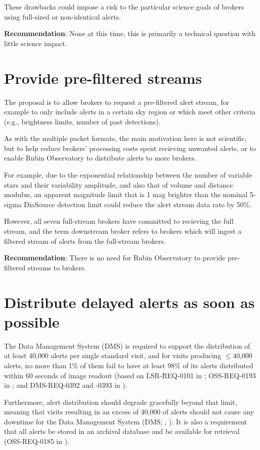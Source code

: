 \documentclass[DM,authoryear,toc]{lsstdoc}
\begin{document}
These drawbacks could impose a risk to the particular science goals of brokers using full-sized or non-identical alerts.

\textbf{Recommendation}: None at this time, this is primarily a technical question with little science impact.


\section{Provide pre-filtered streams}\label{sec:prefilter}

The proposal is to allow brokers to request a pre-filtered alert stream, for example to only include alerts in a certain sky region or which meet other criteria (e.g., brightness limits, number of past detections).

As with the multiple packet formats, the main motivation here is not scientific, but to help reduce brokers' processing costs spent recieving unwanted alerts, or to enable Rubin Observatory to distribute alerts to more brokers.

For example, due to the exponential relationship between the number of variable stars and their variability amplitude, and also that of volume and distance modulus, an apparent magnitude limit that is 1 mag brighter than the nominal 5-sigma DiaSource detection limit could reduce the alert stream data rate by 50\%.

However, all seven full-stream brokers have committed to recieving the full stream, and the term downstream broker refers to brokers which will ingest a filtered stream of alerts from the full-stream brokers.

\textbf{Recommendation}: There is no need for Rubin Observatory to provide pre-filtered streams to brokers.


\section{Distribute delayed alerts as soon as possible}\label{sec:delayed}

The Data Management System (DMS) is required to support the distribution of at least 40,000 alerts per single standard visit, and for visits producing $\leq$40,000 alerts, no more than 1\% of them fail to have at least 98\% of its alerts distributed within 60 seconds of image readout (based on LSR-REQ-0101 in ; OSS-REQ-0193 in ; and DMS-REQ-0392 and -0393 in ).

Furthermore, alert distribution should degrade gracefully beyond that limit, meaning that visits resulting in an excess of 40,000 of alerts should not cause any downtime for the Data Management System (DMS; , ).
It is also a requirement that all alerts be stored in an archival database and be available for retrieval (OSS-REQ-0185 in ).
\end{document}

